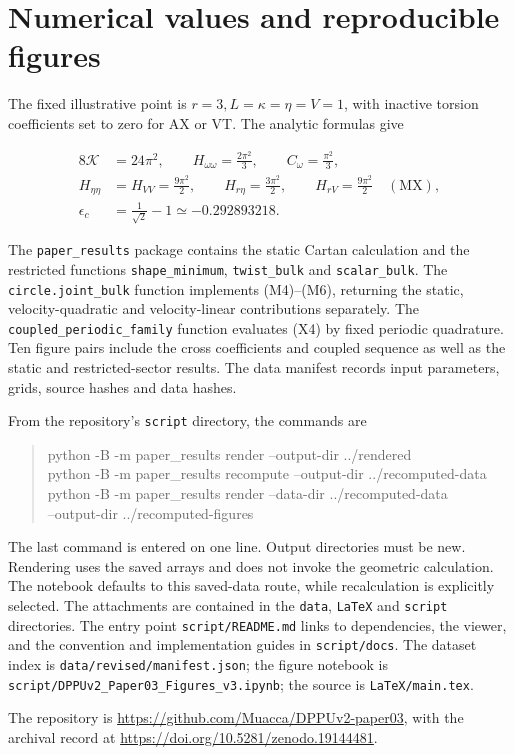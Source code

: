 \section{Numerical values and reproducible figures}

\label{app:H}

The fixed illustrative point is $r=3,L=\kappa=\eta=V=1$, with inactive torsion coefficients set to zero for AX or VT. The analytic formulas give

\begin{equation}\tag{H1}\label{eq:H1}
\begin{aligned}
8\mathcal K&=24\pi^2,\qquad
H_{\omega\omega}=\frac{2\pi^2}{3},\qquad C_\omega=\frac{\pi^2}{3},\\
H_{\eta\eta}&=H_{VV}=\frac{9\pi^2}{2},\qquad
H_{r\eta}=\frac{3\pi^2}{2},\qquad
H_{rV}=\frac{9\pi^2}{2}\quad(\mathrm{MX}),\\
\epsilon_c&=\frac1{\sqrt2}-1\simeq-0.292893218.
\end{aligned}
\end{equation}

The \texttt{paper\_results} package contains the static Cartan calculation and the restricted functions \texttt{shape\_minimum}, \texttt{twist\_bulk} and \texttt{scalar\_bulk}. The \texttt{circle.joint\_bulk} function implements (M4)--(M6), returning the static, velocity-quadratic and velocity-linear contributions separately. The \texttt{coupled\_periodic\_family} function evaluates (X4) by fixed periodic quadrature. Ten figure pairs include the cross coefficients and coupled sequence as well as the static and restricted-sector results. The data manifest records input parameters, grids, source hashes and data hashes.

From the repository's \texttt{script} directory, the commands are
\begin{quote}\small\ttfamily
python -B -m paper\_results render --output-dir ../rendered\\
python -B -m paper\_results recompute --output-dir ../recomputed-data\\
python -B -m paper\_results render --data-dir ../recomputed-data\\
\hspace*{1em}--output-dir ../recomputed-figures
\end{quote}
The last command is entered on one line. Output directories must be new. Rendering uses the saved arrays and does not invoke the geometric calculation. The notebook defaults to this saved-data route, while recalculation is explicitly selected. The attachments are contained in the \texttt{data}, \texttt{LaTeX} and \texttt{script} directories. The entry point \texttt{script/README.md} links to dependencies, the viewer, and the convention and implementation guides in \texttt{script/docs}. The dataset index is \texttt{data/revised/manifest.json}; the figure notebook is \texttt{script/DPPUv2\_Paper03\_Figures\_v3.ipynb}; the source is \texttt{LaTeX/main.tex}.

The repository is \url{https://github.com/Muacca/DPPUv2-paper03}, with the archival record at \url{https://doi.org/10.5281/zenodo.19144481}.
